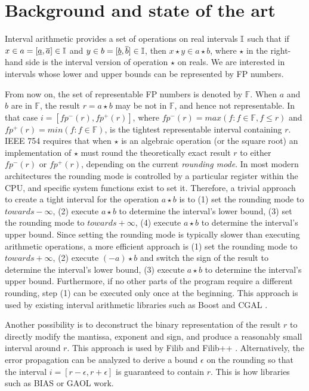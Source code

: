 
\section{Background and state of the art}
\label{sec:related}

Interval arithmetic \cite{hickey2001} provides a set of operations on real intervals $\mathbb{I}$ such that if $x\in a=[\underline{a},\overline{a}] \in \mathbb{I}$ and $y\in b=[\underline{b},\overline{b}] \in \mathbb{I}$,
then $x \star y  \in a \star b$, where $\star$ in the right-hand side is the interval version of operation $\star$ on reals.
We are interested in intervals whose lower and upper bounds can be represented by FP numbers.

From now on, the set of representable FP numbers is denoted by $\mathbb{F}$. When $a$ and $b$ are in $\mathbb{F}$, the result $r = a \star b$ may be not in $\mathbb{F}$, and hence not representable. In that case $i=[fp^{-}(r),fp^{+}(r)]$, where $fp^{-}(r) = max(f : f \in \mathbb{F}, f \leq r)$ and $fp^{+}(r) = min(f : f \in \mathbb{F})$, is the tightest representable interval containing $r$.
IEEE 754 requires that when $\star$ is an algebraic operation (or the square root) an implementation of $\star$ must round the theoretically exact result $r$ to either $fp^{-}(r)$ or $fp^{+}(r)$, depending on the current \emph{rounding mode}.
In most modern architectures the rounding mode is controlled by a particular register within the CPU, and specific system functions exist to set it. Therefore, a trivial approach to create a tight interval for the operation $a \star b$ is to (1) set the rounding mode to $towards -\infty$, (2) execute $a \star b$ to determine the interval's lower bound, (3) set the rounding mode to $towards +\infty$, (4) execute $a \star b$ to determine the interval's upper bound.
Since setting the rounding mode is typically slower than executing arithmetic operations, a more efficient approach is (1) set the rounding mode to $towards +\infty$, (2) execute $(-a) \star b$ and switch the sign of the result to determine the interval's lower bound, (3) execute $a \star b$ to determine the interval's upper bound. Furthermore, if no other parts of the program require a different rounding, step (1) can be executed only once at the beginning.
This approach is used by existing interval arithmetic libraries such as Boost \cite{bronnimann2006} and CGAL \cite{cgal}.

Another possibility is to deconstruct the binary representation of the result $r$ to directly modify the mantissa, exponent and sign, and produce a reasonably small interval around $r$. This approach is used by Filib and Filib++ \cite{filib} .
Alternatively, the error propagation can be analyzed to derive a bound $\epsilon$ on the rounding so that the interval $i=[r-\epsilon,r+\epsilon]$ is guaranteed to contain $r$. This is how libraries such as BIAS \cite{bias} or GAOL \cite{gaol} work.

